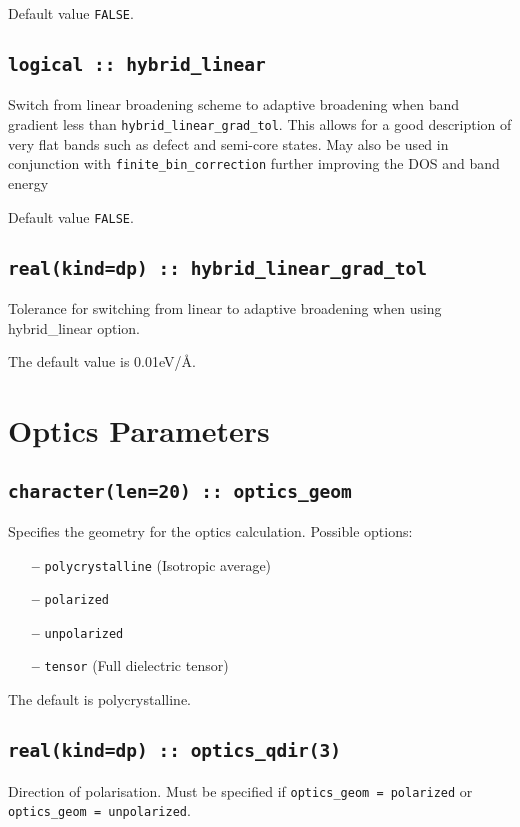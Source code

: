 \documentclass[a4paper,11pt,twoside]{book}
\begin{document}
Default value \verb#FALSE#.

\subsection[hybrid\_linear]{\tt logical :: hybrid\_linear}
Switch from linear broadening scheme to adaptive broadening when band gradient less than \verb#hybrid_linear_grad_tol#.
This allows for a good description of very flat bands such as defect and semi-core states. May also be used in conjunction
with \verb#finite_bin_correction# further improving the DOS and band energy

Default value \verb#FALSE#.

\subsection[hybrid\_linear\_grad\_tol]{\tt real(kind=dp) :: hybrid\_linear\_grad\_tol}
Tolerance for switching from linear to adaptive broadening when using hybrid\_linear option.

The default value is 0.01eV/\AA.

\section{Optics Parameters}

\subsection[optics\_geom]{\tt character(len=20) :: optics\_geom}

Specifies the geometry for the optics calculation.  Possible options:
\begin{itemize}
\item[{\bf --}]  \verb#polycrystalline# (Isotropic average)
\item[{\bf --}]  \verb#polarized#
\item[{\bf --}]  \verb#unpolarized#
\item[{\bf --}]  \verb#tensor# (Full dielectric tensor)
\end{itemize}
The default is polycrystalline.

\subsection[optics\_qdir]{\tt real(kind=dp) :: optics\_qdir(3)}
Direction of polarisation. Must be specified if \verb#optics_geom = polarized#
or \verb#optics_geom = unpolarized#.
\end{document}
